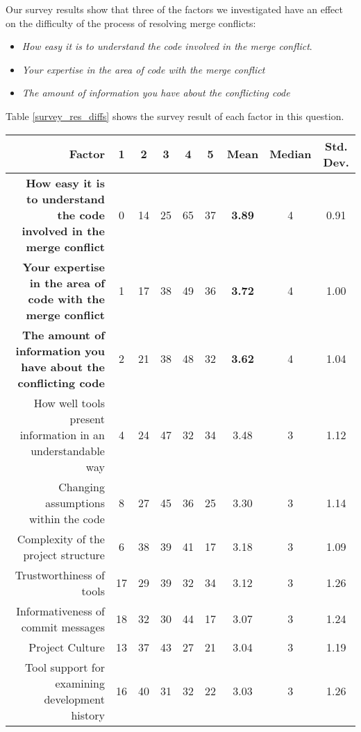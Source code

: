 Our survey results show that three of the factors we investigated have an effect on the difficulty of the process of resolving merge conflicts: 
\begin{itemize}
\item \textit{How easy it is to understand the code involved in the merge conflict}. 
\item \textit{Your expertise in the area of code with the merge conflict}
\item \textit{The amount of information you have about the conflicting code} 
\end{itemize}
Table \ref{survey_res_diffs} shows the survey result of each factor in this question.  

\begin{table*}[!]
\renewcommand{\arraystretch}{1.3}
\caption{Difficulties in Resolving a Merge Conflict from Survey}
\label{survey_res_diffs}
\centering
\begin{tabularx}{0.9\textwidth}{r | *5{c} | *3{c}}

\toprule
	Factor & 1 & 2 & 3 & 4 & 5 & Mean & Median & Std. Dev. \\
\midrule
	\textbf{How easy it is to understand the code involved in the merge conflict} & 0 & 14 & 25 & 65 & 37 & \textbf{3.89} & 4 & 0.91\\
	\textbf{Your expertise in the area of code with the merge conflict} & 1 & 17 & 38 & 49 & 36 & \textbf{3.72} & 4 & 1.00\\
	\textbf{The amount of information you have about the conflicting code} & 2 & 21 & 38 & 48 & 32 & \textbf{3.62} & 4 & 1.04\\
	How well tools present information in an understandable way & 4 & 24 & 47 & 32 & 34 & 3.48 & 3 & 1.12\\
	Changing assumptions within the code & 8 & 27 & 45 & 36 & 25 & 3.30 & 3 & 1.14\\
	Complexity of the project structure & 6 & 38 & 39 & 41 & 17 & 3.18 & 3 & 1.09\\
	Trustworthiness of tools & 17 & 29 & 39 & 32 & 34 & 3.12 & 3 & 1.26\\
	Informativeness of commit messages & 18 & 32 & 30 & 44 & 17 & 3.07 & 3 & 1.24\\
	Project Culture & 13 & 37 & 43 & 27 & 21 & 3.04 & 3 & 1.19\\
	Tool support for examining development history & 16 & 40 & 31 & 32 & 22 & 3.03 & 3 & 1.26\\
\bottomrule
\end{tabularx}
\end{table*}


